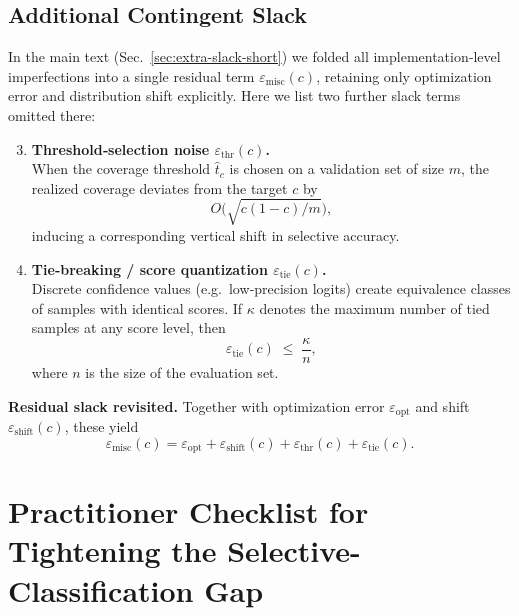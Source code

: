 \subsection{Additional Contingent Slack}
\label{app:extra-slack-omitted}

In the main text (Sec.~\ref{sec:extra-slack-short}) we folded all implementation‐level imperfections into a single residual term \(\varepsilon_{\text{misc}}(c)\), retaining only optimization error and distribution shift explicitly. Here we list two further slack terms omitted there:

\begin{enumerate}[leftmargin=1.2em]
  \setcounter{enumi}{2}
  \item \textbf{Threshold‐selection noise \(\varepsilon_{\text{thr}}(c)\).}\\
    When the coverage threshold \(\hat t_c\) is chosen on a validation set of size \(m\), the realized coverage deviates from the target \(c\) by 
    \begin{equation}
      O\bigl(\sqrt{c(1-c)/m}\bigr),
    \end{equation}
    inducing a corresponding vertical shift in selective accuracy.

  \item \textbf{Tie‐breaking / score quantization \(\varepsilon_{\text{tie}}(c)\).}\\
    Discrete confidence values (e.g.\ low‐precision logits) create equivalence classes of samples with identical scores.  If \(\kappa\) denotes the maximum number of tied samples at any score level, then
    \begin{equation}
      \varepsilon_{\text{tie}}(c)
      \;\le\;
      \frac{\kappa}{n},
    \end{equation}
    where \(n\) is the size of the evaluation set.
\end{enumerate}

\noindent\textbf{Residual slack revisited.}  Together with optimization error \(\varepsilon_{\text{opt}}\) and shift \(\varepsilon_{\text{shift}}(c)\), these yield
\begin{equation}
  \varepsilon_{\text{misc}}(c)
  = \varepsilon_{\text{opt}}
  + \varepsilon_{\text{shift}}(c)
  + \varepsilon_{\text{thr}}(c)
  + \varepsilon_{\text{tie}}(c).
\end{equation}

\section{Practitioner Checklist for Tightening the Selective-Classification Gap}
\label{app:practical-checklist}

